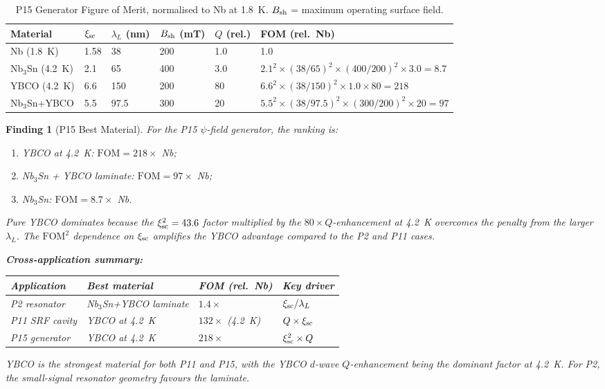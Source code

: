 \documentclass[11pt]{article}
\newtheorem{finding}{Finding}
\begin{document}
\begin{table}[h]
\centering
\caption{P15 Generator Figure of Merit, normalised to Nb at 1.8~K.
$B_{\rm sh}$ = maximum operating surface field.}
\label{tab:FOM-P15}
\begin{tabular}{llllll}
\toprule
Material & $\xi_{\rm sc}$ & $\lambda_L$ (nm) & $B_{\rm sh}$ (mT) & $Q$ (rel.) & FOM (rel.\ Nb) \\
\midrule
Nb (1.8~K) & 1.58 & 38 & 200 & 1.0 & 1.0 \\
Nb$_3$Sn (4.2~K) & 2.1 & 65 & 400 & 3.0 & $2.1^2 \times (38/65)^2 \times (400/200)^2 \times 3.0 = 8.7$ \\
YBCO (4.2~K) & 6.6 & 150 & 200 & 80 & $6.6^2 \times (38/150)^2 \times 1.0 \times 80 = 218$ \\
Nb$_3$Sn+YBCO & 5.5 & 97.5 & 300 & 20 & $5.5^2\times(38/97.5)^2\times(300/200)^2\times20 = 97$ \\
\bottomrule
\end{tabular}
\end{table}

\begin{finding}[P15 Best Material]
\label{finding:FOM-P15}
For the P15 $\psi$-field generator, the ranking is:
\begin{enumerate}
  \item YBCO at 4.2~K: $\text{FOM} = 218\times$ Nb;
  \item Nb$_3$Sn + YBCO laminate: $\text{FOM} = 97\times$ Nb;
  \item Nb$_3$Sn: $\text{FOM} = 8.7\times$ Nb.
\end{enumerate}
Pure YBCO dominates because the $\xi_{\rm sc}^2 = 43.6$ factor multiplied
by the $80\times Q$-enhancement at 4.2~K overcomes the penalty from the
larger $\lambda_L$. The $\text{FOM}^2$ dependence on $\xi_{\rm sc}$ amplifies
the YBCO advantage compared to the P2 and P11 cases.

\textbf{Cross-application summary:}
\begin{center}
\begin{tabular}{llll}
\toprule
Application & Best material & FOM (rel.\ Nb) & Key driver \\
\midrule
P2 resonator & Nb$_3$Sn+YBCO laminate & $1.4\times$ & $\xi_{\rm sc}/\lambda_L$ \\
P11 SRF cavity & YBCO at 4.2~K & $132\times$ (4.2~K) & $Q \times \xi_{\rm sc}$ \\
P15 generator & YBCO at 4.2~K & $218\times$ & $\xi_{\rm sc}^2 \times Q$ \\
\bottomrule
\end{tabular}
\end{center}
YBCO is the strongest material for both P11 and P15, with the YBCO $d$-wave
$Q$-enhancement being the dominant factor at 4.2~K. For P2, the small-signal
resonator geometry favours the laminate.
\end{finding}
\end{document}
